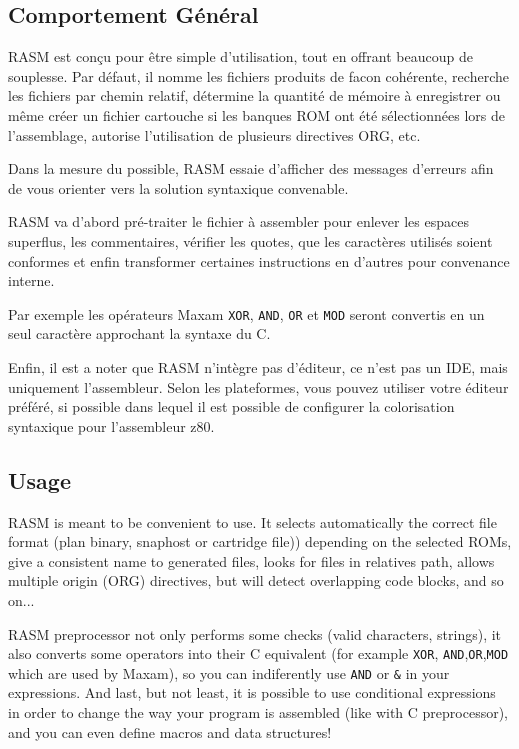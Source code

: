 \begin{xfr}
  \section {Comportement Général}
  RASM est conçu pour être simple d'utilisation, tout en offrant beaucoup de souplesse. Par défaut, il nomme les fichiers produits de facon cohérente, recherche les fichiers par chemin relatif, détermine la quantité de mémoire à enregistrer ou même créer un fichier cartouche si les banques ROM ont été sélectionnées lors de l'assemblage, autorise l'utilisation de plusieurs directives ORG, etc.

  Dans la mesure du possible, RASM essaie d'afficher des messages d'erreurs afin de vous orienter vers la solution syntaxique convenable.

  RASM va d'abord pré-traiter le fichier à assembler pour enlever les espaces superflus, les commentaires, vérifier les quotes, que les caractères utilisés soient conformes et enfin transformer certaines instructions en d'autres pour convenance interne.

 Par exemple les opérateurs Maxam \texttt{XOR}, \texttt{AND}, \texttt{OR} et \texttt{MOD} seront convertis en un seul caractère approchant la syntaxe du C.

Enfin, il est a noter que RASM n'intègre pas d'éditeur, ce n'est pas un IDE, mais uniquement l'assembleur. Selon les plateformes, vous pouvez utiliser votre éditeur préféré, si possible dans lequel il est possible de configurer la colorisation syntaxique pour l'assembleur z80.


\end{xfr}

\begin{xen}
  \section {Usage}
  RASM is meant to be convenient to use. It selects automatically the correct file format (plan binary, snaphost or cartridge file)) depending on the selected ROMs, give a consistent name to generated files, looks for files in relatives path, allows multiple origin (ORG) directives, but will detect overlapping code blocks, and so on...


  RASM preprocessor not only performs some checks (valid characters, strings), it also converts some operators into their C equivalent (for example \texttt{XOR}, \texttt{AND},\texttt{OR},\texttt{MOD} which are used by Maxam), so you can indiferently use \texttt{AND} or \texttt{\&} in your expressions.
  And last, but not least, it is possible to use conditional expressions in order to change the way your program is assembled (like with C preprocessor), and you can even define macros and data structures!
\end{xen}

